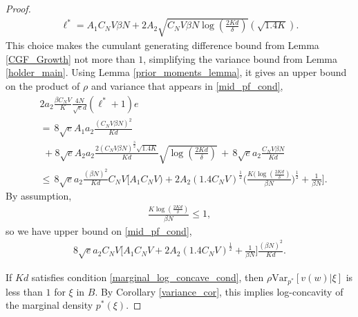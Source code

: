 \documentclass{article}
\numberwithin{equation}{section}
\theoremstyle{Lemma}
\theoremstyle{Corollary}
\theoremstyle{Theorem}
\theoremstyle{Remark}
\begin{document}
\begin{proof}
\begin{align}
       \ell^{*} = A_{1}C_{N}V\beta N+2A_{2}\sqrt{ C_{N}V \beta N\log(\frac{2Kd}{\delta})}(\sqrt{1.4K}).\label{L_star}
   \end{align}
This choice makes the cumulant generating difference bound from Lemma \ref{CGF_Growth} not more than $1$, simplifying the variance bound from Lemma \ref{holder_main}.
Using Lemma \ref{prior_moments_lemma}, it gives an upper bound on the product of $\rho$ and variance that appears in \eqref{mid_pf_cond},
    \begin{align}
        &2a_{2}\frac{\beta C_{N} V}{K}\frac{4 N}{\sqrt{e}d}(\ell^{*}+1)\label{apply_L_star}e\\
        &=\, 8\sqrt{ e}A_{1}a_{2}\frac{(C_{N} V \beta N)^{2}}{Kd}\\
        &\,\,+8\sqrt{e}A_{2}a_{2}\frac{2(C_{N} V \beta N)^{\frac{3}{2}}\sqrt{1.4K}}{Kd}\sqrt{\log(\frac{2Kd}{\delta})} \,+\,8\sqrt{ e}a_{2}\frac{C_{N} V \beta N}{Kd}\\
        &\leq\, 8\sqrt{e}a_{2}\frac{(\beta N)^{2}}{Kd} C_N V\Big[
        A_{1}C_{N}V)+2A_2 (1.4C_{N}V)^{\frac{1}{2}}\Big(\frac{K(\log(\frac{2Kd}{\delta})}{\beta N} \Big)^{\frac{1}{2}} + \frac{1}{\beta N} \Big].
    \end{align}
   By assumption,
   \begin{align}
   \frac{K\log(\frac{2Kd}{\delta})}{\beta N} \leq 1,
   \end{align}
   so we have upper bound on \eqref{mid_pf_cond},
   \begin{align}
   8\sqrt{e}a_{2}C_N V \Big[A_1 C_N V+2A_2 (1.4C_{N}V)^{\frac{1}{2}}+ \frac{1}{\beta N}\Big] \frac{(\beta N)^{2}}{Kd}.\label{main_thm_final_exp}
   \end{align}
    
    If $Kd$ satisfies condition \eqref{marginal_log_concave_cond}, then $\rho \text{Var}_{p^*} [v(w)|\xi]$ is less than $1$ for $\xi$ in $B$. By Corollary \ref{variance_cor}, this implies log-concavity of the marginal density $p^*(\xi)$. 
\end{proof}

\end{document}
